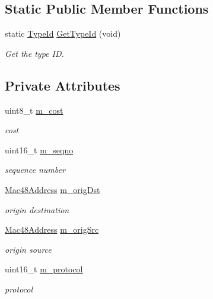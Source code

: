 \subsection*{Static Public Member Functions}
\begin{DoxyCompactItemize}
\item 
static \hyperlink{classns3_1_1TypeId}{Type\+Id} \hyperlink{classns3_1_1flame_1_1FlameHeader_adee8750c320a73f70b40d9b7ff321aa0}{Get\+Type\+Id} (void)
\begin{DoxyCompactList}\small\item\em Get the type ID. \end{DoxyCompactList}\end{DoxyCompactItemize}
\subsection*{Private Attributes}
\begin{DoxyCompactItemize}
\item 
uint8\+\_\+t \hyperlink{classns3_1_1flame_1_1FlameHeader_a097344abc0c05a21e74c0a48de485e61}{m\+\_\+cost}
\begin{DoxyCompactList}\small\item\em cost \end{DoxyCompactList}\item 
uint16\+\_\+t \hyperlink{classns3_1_1flame_1_1FlameHeader_a47aa4a93caa305da7ed2e7a725b9ec25}{m\+\_\+seqno}
\begin{DoxyCompactList}\small\item\em sequence number \end{DoxyCompactList}\item 
\hyperlink{classns3_1_1Mac48Address}{Mac48\+Address} \hyperlink{classns3_1_1flame_1_1FlameHeader_a190500359f4ef570957b379b626edbfc}{m\+\_\+orig\+Dst}
\begin{DoxyCompactList}\small\item\em origin destination \end{DoxyCompactList}\item 
\hyperlink{classns3_1_1Mac48Address}{Mac48\+Address} \hyperlink{classns3_1_1flame_1_1FlameHeader_ac96cf4f51d80425b06d14eaac936348b}{m\+\_\+orig\+Src}
\begin{DoxyCompactList}\small\item\em origin source \end{DoxyCompactList}\item 
uint16\+\_\+t \hyperlink{classns3_1_1flame_1_1FlameHeader_a2d6d58622168d0626903ffc45a066569}{m\+\_\+protocol}
\begin{DoxyCompactList}\small\item\em protocol \end{DoxyCompactList}\end{DoxyCompactItemize}
